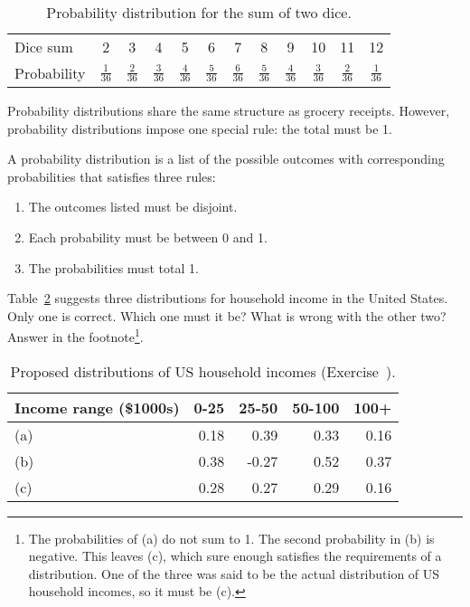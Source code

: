 \begin{table}[h] \small
\centering
\begin{tabular}{l ccc ccc ccc cc}
  \hline
Dice sum & 2 & 3 & 4 & 5 & 6 & 7 & 8 & 9 & 10 & 11 & 12  \\
Probability & $\frac{1}{36}$ & $\frac{2}{36}$ & $\frac{3}{36}$ & $\frac{4}{36}$ & $\frac{5}{36}$ & $\frac{6}{36}$ & $\frac{5}{36}$ & $\frac{4}{36}$ & $\frac{3}{36}$ & $\frac{2}{36}$ & $\frac{1}{36}$\vspace{0.1cm} \\
   \hline
\end{tabular}
\caption{Probability distribution for the sum of two dice.}
\label{diceProb}
\end{table}

Probability distributions share the same structure as grocery receipts. However, probability distributions impose one special rule: the total must be 1. 

\begin{termBox}{
A probability distribution is a list of the possible outcomes with corresponding probabilities that satisfies three rules: \vspace{-2mm}
\begin{enumerate}
\setlength{\itemsep}{0mm}
\item The outcomes listed must be disjoint.
\item Each probability must be between 0 and 1.
\item The probabilities must total 1. \vspace{1mm}
\end{enumerate}}
\end{termBox}

\vspace{-10mm}

\begin{exercise}\label{usHouseholdIncomeDistsExercise}
Table~\ref{usHouseholdIncomeDists} suggests three distributions for household income in the United States. Only one is correct. Which one must it be? What is wrong with the other two? Answer in the footnote\footnote{The probabilities of (a) do not sum to 1. The second probability in (b) is negative. This leaves (c), which sure enough satisfies the requirements of a distribution. One of the three was said to be the actual distribution of US household incomes, so it must be (c).}.
\end{exercise}
\begin{table}
\centering
\begin{tabular}{l | rr rr}
  \hline
Income range (\$1000s) & 0-25    & 25-50    & 50-100     & 100+    \\
  \hline
(a)				 & 0.18 & 0.39 & 0.33 & 0.16 \\
(b)				 & 0.38 & -0.27 & 0.52 & 0.37 \\
(c)				 & 0.28 & 0.27 & 0.29 & 0.16 \\
  \hline
\end{tabular}
\caption{Proposed distributions of US household incomes (Exercise~).}
\label{usHouseholdIncomeDists}
\end{table}

